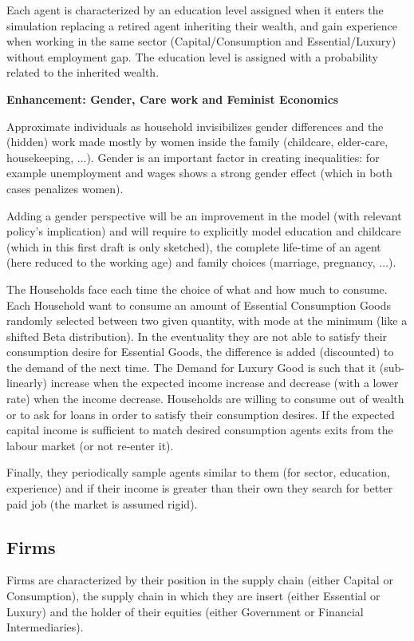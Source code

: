 \documentclass[a4paper, headings=standardclasses]{scrartcl}
\newenvironment{enh}[1][]{\begin{framed}\noindent\textbf{Enhancement: #1}\par}{\end{framed}}
\begin{document}
Each agent is characterized by an education level assigned when it enters the simulation replacing a retired agent inheriting their wealth, and gain experience when working in the same sector (Capital/Consumption and Essential/Luxury) without employment gap.
The education level is assigned with a probability related to the inherited wealth. 

\begin{enh}[Gender, Care work and Feminist Economics]
	Approximate individuals as household invisibilizes gender differences and the (hidden) work made mostly by women inside the family (childcare, elder-care, housekeeping, ...).
	Gender is an important factor in creating inequalities: for example unemployment and wages shows a strong gender effect (which in both cases penalizes women).
	
	Adding a gender perspective will be an improvement in the model (with relevant policy's implication) and will require to explicitly model education and childcare (which in this first draft is only sketched), the complete life-time of an agent (here reduced to the working age) and family choices (marriage, pregnancy, ...).
\end{enh}

The Households face each time the choice of what and how much to consume. 
Each Household want to consume an amount of Essential Consumption Goods randomly selected between two given quantity, with mode at the minimum (like a shifted Beta distribution). In the eventuality they are not able to satisfy their consumption desire for Essential Goods, the difference is added (discounted) to the demand of the next time.
The Demand for Luxury Good is such that it (sub-linearly) increase when the expected income increase and decrease (with a lower rate) when the income decrease. Households are willing to consume out of wealth or to ask for loans in order to satisfy their consumption desires.
If the expected capital income is sufficient to match desired consumption agents exits from the labour market (or not re-enter it).

Finally, they periodically sample agents similar to them (for sector, education, experience) and if their income is greater than their own they search for better paid job (the market is assumed rigid). 


\subsection{Firms}
Firms are characterized by their position in the supply chain (either Capital or Consumption), the supply chain in which they are insert (either Essential or Luxury) and the holder of their equities (either Government or Financial Intermediaries).
\end{document}

